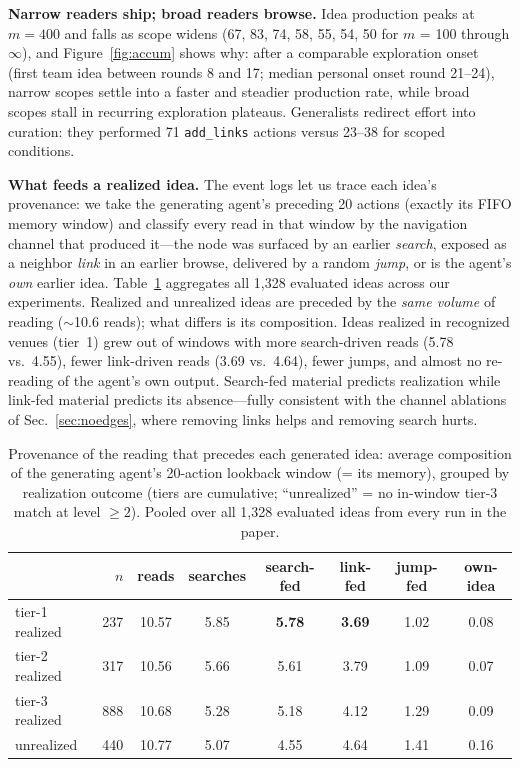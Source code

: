 \documentclass{article} %
\begin{document}
\textbf{Narrow readers ship; broad readers browse.} Idea production
peaks at $m{=}400$ and falls as scope widens (67, 83, 74, 58, 55, 54,
50 for $m$ = 100 through $\infty$), and
Figure~\ref{fig:accum} shows why: after a comparable exploration onset
(first team idea between rounds 8 and 17; median personal onset round
21--24), narrow scopes settle into a faster and steadier production
rate, while broad scopes stall in recurring exploration plateaus.
Generalists redirect effort into curation: they performed 71
\texttt{add\_links} actions versus 23--38 for scoped conditions.

\textbf{What feeds a realized idea.} The event logs let us trace each
idea's provenance: we take the generating agent's preceding 20 actions
(exactly its FIFO memory window) and classify every read in that window
by the navigation channel that produced it---the node was surfaced by an
earlier \emph{search}, exposed as a neighbor \emph{link} in an earlier
browse, delivered by a random \emph{jump}, or is the agent's \emph{own}
earlier idea. Table~\ref{tab:provenance} aggregates all 1{,}328
evaluated ideas across our experiments. Realized and unrealized ideas
are preceded by the \emph{same volume} of reading ($\sim$10.6 reads);
what differs is its composition. Ideas realized in recognized venues
(tier~1) grew out of windows with more search-driven reads (5.78
vs.\ 4.55), fewer link-driven reads (3.69 vs.\ 4.64), fewer jumps, and
almost no re-reading of the agent's own output. Search-fed material predicts realization while link-fed material
predicts its absence---fully consistent with the channel ablations of
Sec.~\ref{sec:noedges}, where removing links helps and removing search
hurts.

\begin{table}[t]
\caption{Provenance of the reading that precedes each generated idea:
average composition of the generating agent's 20-action lookback window
(= its memory), grouped by realization outcome (tiers are cumulative;
``unrealized'' = no in-window tier-3 match at level $\geq 2$). Pooled
over all 1{,}328 evaluated ideas from every run in the paper.}
\label{tab:provenance}
\begin{center}\small
\begin{tabular}{lrcccccc}
\toprule
 & $n$ & \textbf{reads} & \textbf{searches} &
 \textbf{search-fed} & \textbf{link-fed} & \textbf{jump-fed} &
 \textbf{own-idea} \\
\midrule
tier-1 realized & 237 & 10.57 & 5.85 & \textbf{5.78} & \textbf{3.69} & 1.02 & 0.08 \\
tier-2 realized & 317 & 10.56 & 5.66 & 5.61 & 3.79 & 1.09 & 0.07 \\
tier-3 realized & 888 & 10.68 & 5.28 & 5.18 & 4.12 & 1.29 & 0.09 \\
unrealized      & 440 & 10.77 & 5.07 & 4.55 & 4.64 & 1.41 & 0.16 \\
\bottomrule
\end{tabular}
\end{center}
\end{table}
\end{document}
